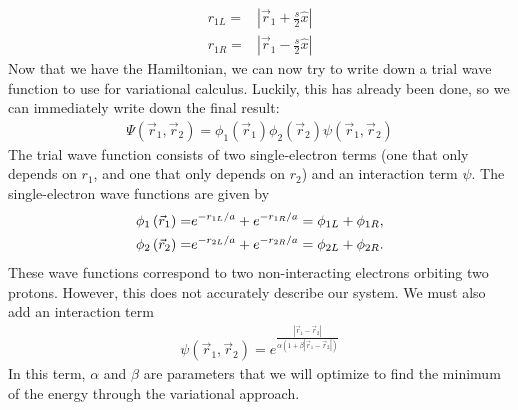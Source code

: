 \begin{align}
{r_{1L}} =& \left| {{{\vec r}_1} + \frac{s}{2}\hat x} \right|\\{r_{1R}} =& \left| {{{\vec r}_1} - \frac{s}{2}\hat x} \right|
\end{align}
Now that we have the Hamiltonian, we can now try to write down a trial wave function to use for variational calculus. Luckily, this has already been done, so we can immediately write down the final result\cite{MSU_paper}:
\begin{align}
\Psi \left( {{{\vec r}_1},{{\vec r}_2}} \right) = {\phi _1}\left( {{{\vec r}_1}} \right){\phi _2}\left( {{{\vec r}_2}} \right)\psi \left( {{{\vec r}_1},{{\vec r}_2}} \right)
\end{align}
The trial wave function consists of two single-electron terms (one that only depends on $r_1$, and one that only depends on $r_2$) and an interaction term $\psi$. The single-electron wave functions are given by
\begin{align}
{\phi _1}\left( {{{\vec r}_1}} \right) =& {e^{ - {{{r_{1L}}} \mathord{\left/
 {\vphantom {{{r_{1L}}} a}} \right.
 \kern-\nulldelimiterspace} a}}} + {e^{ - {{{r_{1R}}} \mathord{\left/
 {\vphantom {{{r_{1R}}} a}} \right.
 \kern-\nulldelimiterspace} a}}} = {\phi _{1L}} + {\phi _{1R}},\\
 {\phi _2}\left( {{{\vec r}_2}} \right) =& {e^{ - {{{r_{2L}}} \mathord{\left/
 {\vphantom {{{r_{2L}}} a}} \right.
 \kern-\nulldelimiterspace} a}}} + {e^{ - {{{r_{2R}}} \mathord{\left/
 {\vphantom {{{r_{2R}}} a}} \right.
 \kern-\nulldelimiterspace} a}}} = {\phi _{2L}} + {\phi _{2R}}.
\end{align}
These wave functions correspond to two non-interacting electrons orbiting two protons. However, this does not accurately describe our system. We must also add an interaction term
\begin{align}
\psi \left( {{{\vec r}_1},{{\vec r}_2}} \right) = {e^{\frac{{\left| {{{\vec r}_1} - {{\vec r}_2}} \right|}}{{\alpha \left( {1 + \beta \left| {{{\vec r}_1} - {{\vec r}_2}} \right|} \right)}}}}
\end{align}
In this term, $\alpha$ and $\beta$ are parameters that we will optimize to find the minimum of the energy through the variational approach.\\
